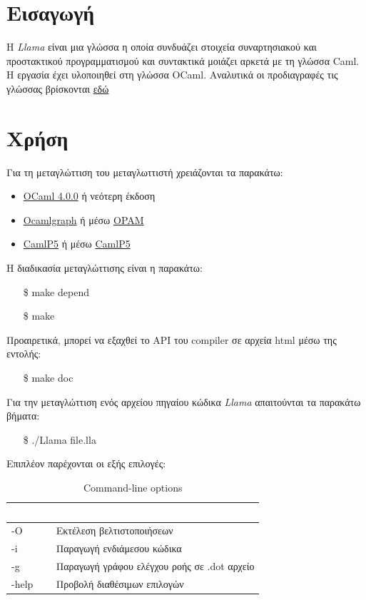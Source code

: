 \documentclass[12pt]{article}
\newcommand{\Llama}{\textit{Llama }}
\begin{document}
\section{Εισαγωγή}
H \Llama είναι μια γλώσσα η οποία συνδυάζει στοιχεία συναρτησιακού και προστακτικού προγραμματισμού και συντακτικά μοιάζει αρκετά με τη γλώσσα Caml. Η εργασία έχει υλοποιηθεί στη γλώσσα OCaml. Αναλυτικά οι προδιαγραφές τις γλώσσας βρίσκονται \href{http://courses.softlab.ntua.gr/compilers/2012a/llama2012.pdf}{εδώ}
\section{Χρήση}
Για τη μεταγλώττιση του μεταγλωττιστή χρειάζονται τα παρακάτω:
\begin{itemize}
\item \href{http://ocaml.org/install.html}{OCaml 4.0.0} ή νεότερη έκδοση
\item \href{http://ocamlgraph.lri.fr}{Ocamlgraph} ή μέσω \href{http://opam.ocaml.org/pkg/ocamlgraph/}{OPAM}
\item \href{http://pauillac.inria.fr/~ddr/camlp5/}{CamlP5} ή μέσω \href{http://opam.ocaml.org/pkg/camlp5}{CamlP5}
\end{itemize}

Η διαδικασία μεταγλώττισης είναι η παρακάτω:
\begin{itemize}
\item[\$] make depend
\item[\$] make
\end{itemize}
Προαιρετικά, μπορεί να εξαχθεί το API του compiler σε αρχεία html μέσω της εντολής:
\begin{itemize}
\item[\$] make doc
\end{itemize}
Για την μεταγλώττιση ενός αρχείου πηγαίου κώδικα \Llama απαιτούνται τα παρακάτω βήματα:
\begin{itemize}
\item[\$] ./Llama file.lla
\end{itemize}
Επιπλέον παρέχονται οι εξής επιλογές:


\begin{table}[htbp]
\centering
\begin{tabular}{|l|l|}
\hline
   \rowcolor{ablack}
    \textcolor{white}{Option} & \textcolor{white}{Description} \\ \hline
    
    \rowcolor{gray}
    -O & Εκτέλεση βελτιστοποιήσεων \\ 
    
    -i & Παραγωγή ενδιάμεσου κώδικα \\ 
    
     \rowcolor{gray}
    -g & Παραγωγή γράφου ελέγχου ροής σε .dot αρχείο \\
    
    -help & Προβολή διαθέσιμων επιλογών \\ 
    
\hline
\end{tabular}
\caption{Command-line options}
\end{table}
\end{document}
